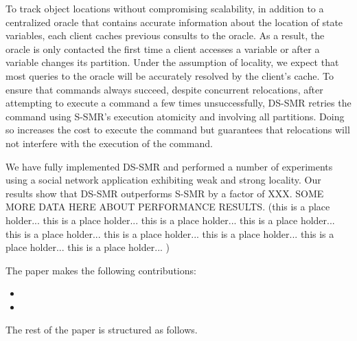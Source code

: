 To track object locations without compromising scalability, in addition to a centralized oracle that contains accurate information about the location of state variables, each client caches previous consults to the oracle.
As a result, the oracle is only contacted the first time a client accesses a variable or after a variable changes its partition.
Under the assumption of locality, we expect that most queries to the oracle will be accurately resolved by the client's cache.
To ensure that commands always succeed, despite concurrent relocations, after attempting to execute a command a few times unsuccessfully, DS-SMR retries the command using S-SMR's execution atomicity and involving all partitions. 
Doing so increases the cost to execute the command but guarantees that relocations will not interfere with the execution of the command.

We have fully implemented DS-SMR and performed a number of experiments using a social network application exhibiting weak and strong locality.
Our results show that DS-SMR outperforms S-SMR by a factor of XXX. SOME MORE DATA HERE ABOUT PERFORMANCE RESULTS. (this is a place holder... this is a place holder... this is a place holder... this is a place holder... this is a place holder... this is a place holder... this is a place holder... this is a place holder... this is a place holder... )

The paper makes the following contributions:
\begin{itemize}
\item
\item
\end{itemize}

The rest of the paper is structured as follows.






